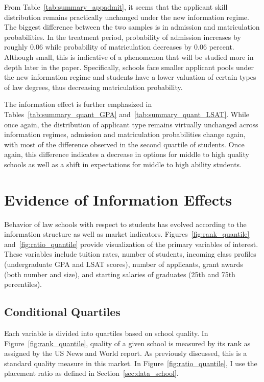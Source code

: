 \documentclass[12pt]{article}
\theoremstyle{definition}
\begin{document}
From Table~\ref{tab:summary_appadmit}, it seems that the applicant skill distribution remains practically unchanged under the new information regime. The biggest difference between the two samples is in admission and matriculation probabilities. In the treatment period, probability of admission increases by roughly 0.06 while probability of matriculation decreases by 0.06 percent. Although small, this is indicative of a phenomenon that will be studied more in depth later in the paper. Specifically, schools face smaller applicant pools under the new information regime and students have a lower valuation of certain types of law degrees, thus decreasing matriculation probability.

The information effect is further emphasized in Tables~\ref{tab:summary_quant_GPA} and~\ref{tab:summary_quant_LSAT}. While once again, the distribution of applicant type remains virtually unchanged across information regimes, admission and matriculation probabilities change again, with most of the difference observed in the second quartile of students. Once again, this difference indicates a decrease in options for middle to high quality schools as well as a shift in expectations for middle to high ability students.



\section{Evidence of Information Effects}
\label{sec:rf}

Behavior of law schools with respect to students has evolved according to the information structure as well as market indicators. Figures~\ref{fig:rank_quantile} and~\ref{fig:ratio_quantile} provide visualization of the primary variables of interest. These variables include tuition rates, number of students, incoming class profiles (undergraduate GPA and LSAT scores), number of applicants, grant awards (both number and size), and starting salaries of graduates (25th and 75th percentiles).

\subsection{Conditional Quartiles}

Each variable is divided into quartiles based on school quality. In Figure~\ref{fig:rank_quantile}, quality of a given school is measured by its rank as assigned by the US News and World report. As previously discussed, this is a standard quality measure in this market. In Figure~\ref{fig:ratio_quantile}, I use the placement ratio as defined in Section~\ref{sec:data_school}.
\end{document}
